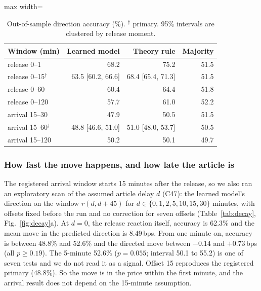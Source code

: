 \documentclass[conference]{IEEEtran}
\newcommand{\bps}{\,bps}
\begin{document}
\begin{table}[t]\centering\footnotesize
\caption{Out-of-sample direction accuracy (\%). $^\dagger$ primary. 95\% intervals are clustered by
release moment.}\label{tab:dir}
\begin{adjustbox}{max width=\columnwidth}
\begin{tabular}{@{}lrrr@{}}
\toprule
Window (min) & Learned model & Theory rule & Majority\\
\midrule
release 0--1 & 68.2 & 75.2 & 51.5\\
release 0--15$^\dagger$ & 63.5 [60.2, 66.6] & 68.4 [65.4, 71.3] & 51.5\\
release 0--60 & 60.4 & 64.4 & 51.8\\
release 0--120 & 57.7 & 61.0 & 52.2\\
\midrule
arrival 15--30 & 47.9 & 50.5 & 51.5\\
arrival 15--60$^\dagger$ & 48.8 [46.6, 51.0] & 51.0 [48.0, 53.7] & 50.5\\
arrival 15--120 & 50.2 & 50.1 & 49.7\\
\bottomrule
\end{tabular}
\end{adjustbox}
\end{table}

\subsubsection{How fast the move happens, and how late the article is}
The registered arrival window starts 15 minutes after the release, so we also ran an exploratory
scan of the assumed article delay $d$ (C47): the learned model's direction on the window
$r(d,d{+}45)$ for $d\in\{0,1,2,5,10,15,30\}$ minutes, with offsets fixed before the run and no
correction for seven offsets (Table~\ref{tab:decay}, Fig.~\ref{fig:decay}a). At $d=0$, the release
reaction itself, accuracy is 62.3\% and the mean move in the predicted direction is 8.49\bps. From
one minute on, accuracy is between 48.8\% and 52.6\% and the directed move between $-0.14$ and
$+0.73$\bps{} (all $p\ge0.19$). The 5-minute 52.6\% ($p=0.055$; interval 50.1 to 55.2) is one of seven tests and we do
not read it as a signal. Offset 15 reproduces the registered primary (48.8\%). So the move is in the
price within the first minute, and the arrival result does not depend on the 15-minute assumption.
\end{document}
